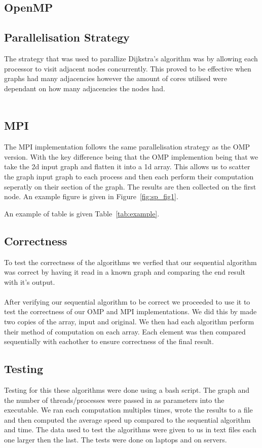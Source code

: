\subsection{OpenMP}
\subsection*{Parallelisation Strategy}
The strategy that was used to parallize Dijkstra's algorithm was by allowing each processor to visit adjacent nodes concurrently. This proved to be effective when graphs had many adjacencies however the amount of cores utilised were dependant on how many adjacencies the nodes had.\\\\

\subsection{MPI}
The MPI implementation follows the same parallelisation strategy as the OMP version. With the key difference being that the OMP implemention being that we take the 2d input graph and flatten it into a 1d array. This allows us to scatter the graph input graph to each process and then each perform their computation seperatly on their section of the graph. The results are then collected on the first node. 
An example figure is given in Figure~\ref{fig:sp_fig1}.

An example of table is given Table~\ref{tab:example}.

\subsection{Correctness}
To test the correctness of the algorithms we verfied that our sequential algorithm was correct by having it read in a known graph and comparing the end result with it's output. \\\\After verifying our sequential algorithm to be correct we proceeded to use it to test the correctness of our OMP and MPI implementations. We did this by made two copies of the array, input and original. We then had each algorithm perform their method of computation on each array. Each element was then compared sequentially with eachother to ensure correctness of the final result.
\subsection{Testing}
Testing for this these algorithms were done using a bash script. The graph and the number of threads/processes were passed in as parameters into the executable. We ran each computation multiples times, wrote the results to a file and then computed the average speed up compared to the sequential algorithm and time.
The data used to test the algorithms were given to us in text files each one larger then the last.
The tests were done on laptops and on servers.
